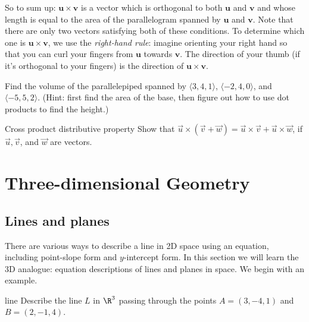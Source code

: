 \documentclass{watsonbook}
\begin{document}
So to sum up: $\mathbf{u} \times \mathbf{v}$ is a vector which is
orthogonal to both $\mathbf{u}$ and $\mathbf{v}$ and whose length is
equal to the area of the parallelogram spanned by $\mathbf{u}$ and
$\mathbf{v}$. Note that there are only two vectors satisfying both of
these conditions. To determine which one is
$\mathbf{u} \times \mathbf{v}$, we use the \textit{right-hand rule}:
imagine orienting your right hand so that you can curl your fingers
from $\mathbf{u}$ towards $\mathbf{v}$. The direction of your thumb
(if it's orthogonal to your fingers) is the direction of
$\mathbf{u} \times \mathbf{v}$.

\begin{exercise}{}{}
  Find the volume of the parallelepiped spanned by
  $\langle 3,4,1 \rangle$,  $\langle -2,4,0 \rangle$, and 
  $\langle -5,5,2 \rangle$. (Hint: first find the area of the base,
  then figure out how to use dot products to find the height.) 
\end{exercise}

\begin{exercise}{Cross product distributive property}{}
  Show that $\vec{u} \times (\vec{v} + \vec{w}) = \vec{u}\times
  \vec{v} + \vec{u} \times \vec{w}$, if $\vec{u}, \vec{v}$, and
  $\vec{w}$ are vectors. 
\end{exercise}

\chapter{Three-dimensional Geometry}

\section{Lines and planes} \label{sec:lines_and_planes} 

There are various ways to describe a line in 2D space using an
equation, including point-slope form and $y$-intercept form. In this
section we will learn the 3D analogue: equation descriptions of lines
and planes in space. We begin with an example.

\begin{example}{}{line}
  Describe the line $L$ in $\R^3$ passing through the points
  $A = (3,-4,1)$ and $B = (2,-1,4)$.
\end{example}
\end{document}
